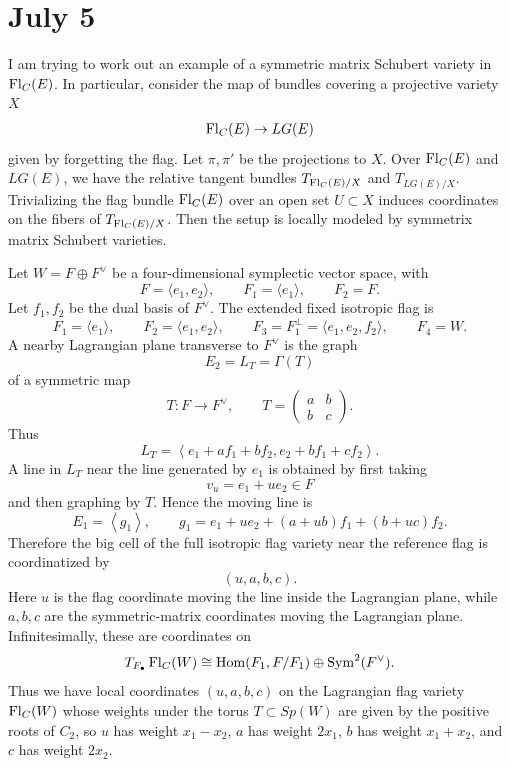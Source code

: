 \documentclass[12pt]{article}
\begin{document}
\section{July 5}
I am trying to work out an example of a symmetric matrix Schubert variety in $\operatorname{Fl}_C(E)$. In particular, consider the map of bundles covering a projective variety $X$\begin{align*}
    \operatorname{Fl}_C(E)\to LG(E)
\end{align*} given by forgetting the flag. Let $\pi,\pi'$ be the projections to $X$. Over $\operatorname{Fl}_C(E)$ and $LG(E)$, we have the relative tangent bundles $T_{\operatorname{Fl}_C(E)/X}$ and $T_{LG(E)/X}$. Trivializing the flag bundle $\operatorname{Fl}_C(E)$ over an open set $U\subset X$ induces coordinates on the fibers of $T_{\operatorname{Fl}_C(E)/X}$. Then the setup is locally modeled by symmetrix matrix Schubert varieties.

Let $W=F\oplus F^\vee$ be a four-dimensional symplectic vector space, with
\[
    F=\langle e_1,e_2\rangle,
    \qquad
    F_1=\langle e_1\rangle,
    \qquad
    F_2=F.
\]
Let $f_1,f_2$ be the dual basis of $F^\vee$. The extended fixed isotropic flag is
\[
    F_1=\langle e_1\rangle,
    \qquad
    F_2=\langle e_1,e_2\rangle,
    \qquad
    F_3=F_1^\perp=\langle e_1,e_2,f_2\rangle,
    \qquad
    F_4=W.
\]
A nearby Lagrangian plane transverse to $F^\vee$ is the graph
\[
    E_2=L_T=\Gamma(T)
\]
of a symmetric map
\[
    T:F\to F^\vee,
    \qquad
    T=
    \begin{pmatrix}
        a & b\\
        b & c
    \end{pmatrix}.
\]
Thus
\[
    L_T=
    \left\langle
        e_1+a f_1+b f_2,
        e_2+b f_1+c f_2
    \right\rangle.
\]
A line in $L_T$ near the line generated by $e_1$ is obtained by first taking
\[
    v_u=e_1+u e_2\in F
\]
and then graphing by $T$. Hence the moving line is
\[
    E_1
    =
    \left\langle
        g_1
    \right\rangle,
    \qquad
    g_1
    =
    e_1+u e_2+(a+ub)f_1+(b+uc)f_2.
\]
Therefore the big cell of the full isotropic flag variety near the reference flag is coordinatized by
\[
    (u,a,b,c).
\]
Here $u$ is the flag coordinate moving the line inside the Lagrangian plane, while $a,b,c$ are the symmetric-matrix coordinates moving the Lagrangian plane. Infinitesimally, these are coordinates on
\[
    T_{F_\bullet}\operatorname{Fl}_C(W)
    \cong
    \operatorname{Hom}(F_1,F/F_1)
    \oplus
    \operatorname{Sym}^2(F^\vee).
\]
Thus we have local coordinates $(u,a,b,c)$ on the Lagrangian flag variety $\operatorname{Fl}_C(W)$ whose weights under the torus $T\subset Sp(W)$ are given by the positive roots of $C_2$, so $u$ has weight $x_1-x_2$, $a$ has weight $2x_1$, $b$ has weight $x_1+x_2$, and $c$ has weight $2x_2$. 
\end{document}

